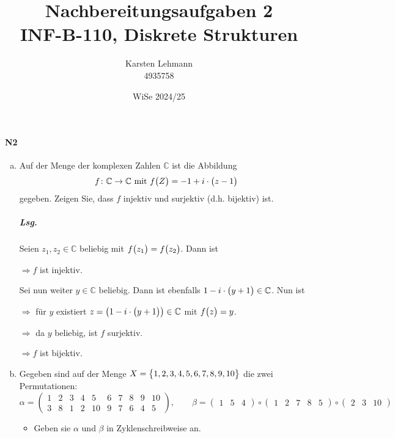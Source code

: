 \documentclass{scrreprt}
\author{Karsten Lehmann \\ 4935758}
\date{WiSe 2024/25}
\title{Nachbereitungsaufgaben 2\\INF-B-110, Diskrete Strukturen}
\begin{document}
\paragraph{N2}
\begin{enumerate}[(a)]
\item Auf der Menge der komplexen Zahlen $\mathbb{C}$ ist die Abbildung
  \[
    f \colon \mathbb{C} \to \mathbb{C} \text{ mit }
    f\qty\big(Z) = -1 + i \cdot \qty\big(z - 1)
  \]
  gegeben.
  Zeigen Sie, dass $f$ injektiv und surjektiv (d.h. bijektiv) ist.

  \subparagraph{Lsg.} Seien $z_1, z_2 \in \mathbb{C}$ beliebig mit
  $f\qty\big(z_1) = f\qty\big(z_2)$.
  Dann ist
  $\Rightarrow f$ ist injektiv.

  Sei nun weiter $y \in \mathbb{C}$ beliebig.
  Dann ist ebenfalls $1 - i \cdot \qty\big(y + 1) \in \mathbb{C}$.
  Nun ist
  $\Rightarrow$ für $y$ existiert
  $z = \qty\big(1 - i \cdot \qty\big(y + 1)) \in \mathbb{C}$
  mit $f\qty\big(z) = y$.

  $\Rightarrow$ da $y$ beliebig, ist $f$ surjektiv.

  $\Rightarrow f$ ist bijektiv.

\item Gegeben sind auf der Menge
  $X = \qty\big{1, 2, 3, 4, 5, 6, 7, 8, 9, 10}$ die zwei Permutationen:
  \[
    \alpha = \begin{pmatrix}
      1 & 2 & 3 & 4 & 5 & 6 & 7 & 8 & 9 & 10 \\
      3 & 8 & 1 & 2 & 10 & 9 & 7 & 6 & 4 & 5
    \end{pmatrix}, \qquad
    \beta = \begin{pmatrix} 1 & 5 & 4 \end{pmatrix} \circ
    \begin{pmatrix} 1 & 2 & 7 & 8 & 5 \end{pmatrix} \circ
    \begin{pmatrix} 2 & 3 & 10 \end{pmatrix}
  \]
  \begin{itemize}
  \item Geben sie $\alpha$ und $\beta$ in Zyklenschreibweise an.


\end{itemize}
\end{enumerate}
\end{document}
